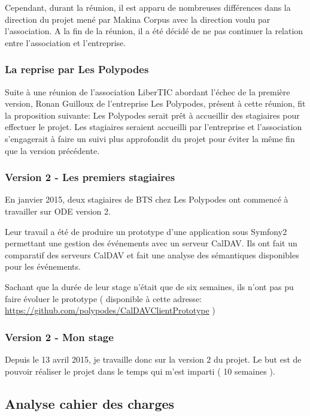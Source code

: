 Cependant, durant la réunion, il est apparu de nombreuses différences dans la direction du projet mené par Makina Corpus avec la direction voulu par l'association. A la fin de la réunion, il a été décidé de ne pas continuer la relation entre l'association et l'entreprise.

\subsubsection*{La reprise par Les Polypodes}

Suite à une réunion de l'association LiberTIC abordant l'échec de la première version, Ronan Guilloux de l'entreprise Les Polypodes, présent à cette réunion, fit la proposition suivante: Les Polypodes serait prêt à accueillir des stagiaires pour effectuer le projet. Les stagiaires seraient accueilli par l'entreprise et l'association s'engagerait à faire un suivi plus approfondit du projet pour éviter la même fin que la version précédente.

\subsubsection*{Version 2 - Les premiers stagiaires}

En janvier 2015, deux stagiaires de BTS chez Les Polypodes ont commencé à travailler sur ODE version 2.

Leur travail a été de produire un prototype d'une application sous Symfony2 permettant une gestion des événements avec un serveur CalDAV. Ils ont fait un comparatif des serveurs CalDAV et fait une analyse des sémantiques disponibles pour les événements.

Sachant que la durée de leur stage n'était que de six semaines, ils n'ont pas pu faire évoluer le prototype ( disponible à cette adresse: \url{https://github.com/polypodes/CalDAVClientPrototype} )

\subsubsection*{Version 2 - Mon stage}

Depuis le 13 avril 2015, je travaille donc sur la version 2 du projet. Le but est de pouvoir réaliser le projet dans le temps qui m'est imparti ( 10 semaines ).

\subsection{Analyse cahier des charges}

